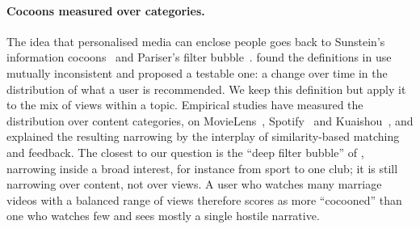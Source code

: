 \paragraph{Cocoons measured over categories.} The idea that personalised media can enclose people goes back to Sunstein's information cocoons~\citep{sunstein2006infotopia,sunstein2017republic} and Pariser's filter bubble~\citep{pariser2011filter}. \citet{michiels2022filterbubbles} found the definitions in use mutually inconsistent and proposed a testable one: a change over time in the distribution of what a user is recommended. We keep this definition but apply it to the mix of views within a topic. Empirical studies have measured the distribution over content categories, on MovieLens~\citep{nguyen2014exploring}, Spotify~\citep{anderson2020spotify} and Kuaishou~\citep{li2022cocoon}, and \citet{piao2023cocoons} explained the resulting narrowing by the interplay of similarity-based matching and feedback. The closest to our question is the ``deep filter bubble'' of \citet{sukiennik2024deep}, narrowing inside a broad interest, for instance from sport to one club; it is still narrowing over content, not over views. A user who watches many marriage videos with a balanced range of views therefore scores as more ``cocooned'' than one who watches few and sees mostly a single hostile narrative.

